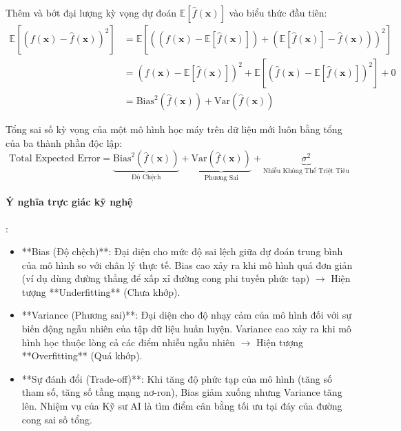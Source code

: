 Thêm và bớt đại lượng kỳ vọng dự đoán $\mathbb{E}[\hat{f}(\mathbf{x})]$ vào biểu thức đầu tiên:
\begin{align}
\mathbb{E}[(f(\mathbf{x}) - \hat{f}(\mathbf{x}))^2] &= \mathbb{E}[ ( (f(\mathbf{x}) - \mathbb{E}[\hat{f}(\mathbf{x})]) + (\mathbb{E}[\hat{f}(\mathbf{x})] - \hat{f}(\mathbf{x})) )^2 ] \nonumber \\
&= (f(\mathbf{x}) - \mathbb{E}[\hat{f}(\mathbf{x})])^2 + \mathbb{E}[(\hat{f}(\mathbf{x}) - \mathbb{E}[\hat{f}(\mathbf{x})])^2] + 0 \nonumber \\
&= \text{Bias}^2(\hat{f}(\mathbf{x})) + \text{Var}(\hat{f}(\mathbf{x}))
\end{align}

\begin{theorem}
Tổng sai số kỳ vọng của một mô hình học máy trên dữ liệu mới luôn bằng tổng của ba thành phần độc lập:
\begin{equation}
\text{Total Expected Error} = \underbrace{\text{Bias}^2(\hat{f}(\mathbf{x}))}_{\text{Độ Chệch}} + \underbrace{\text{Var}(\hat{f}(\mathbf{x}))}_{\text{Phương Sai}} + \underbrace{\sigma^2}_{\text{Nhiễu Không Thể Triệt Tiêu}}
\label{eq:bias-variance-decomposition}
\end{equation}
\end{theorem}

\paragraph{Ý nghĩa trực giác kỹ nghệ}:
\begin{itemize}
  \item **Bias (Độ chệch)**: Đại diện cho mức độ sai lệch giữa dự đoán trung bình của mô hình so với chân lý thực tế. Bias cao xảy ra khi mô hình quá đơn giản (ví dụ dùng đường thẳng để xấp xỉ đường cong phi tuyến phức tạp) $\longrightarrow$ Hiện tượng **Underfitting** (Chưa khớp).
  \item **Variance (Phương sai)**: Đại diện cho độ nhạy cảm của mô hình đối với sự biến động ngẫu nhiên của tập dữ liệu huấn luyện. Variance cao xảy ra khi mô hình học thuộc lòng cả các điểm nhiễu ngẫu nhiên $\longrightarrow$ Hiện tượng **Overfitting** (Quá khớp).
  \item **Sự đánh đổi (Trade-off)**: Khi tăng độ phức tạp của mô hình (tăng số tham số, tăng số tầng mạng nơ-ron), Bias giảm xuống nhưng Variance tăng lên. Nhiệm vụ của Kỹ sư AI là tìm điểm cân bằng tối ưu tại đáy của đường cong sai số tổng.
\end{itemize}

